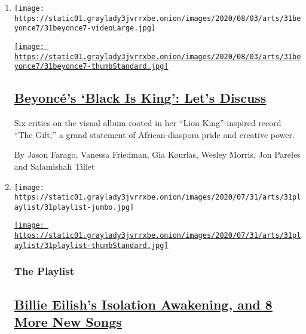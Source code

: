 \begin{enumerate}
\def\labelenumi{\arabic{enumi}.}
\item
  \texttt{[image: https://static01.graylady3jvrrxbe.onion/images/2020/08/03/arts/31beyonce7/31beyonce7-videoLarge.jpg]}

  \href{/2020/07/31/arts/music/beyonce-black-is-king.html}{\texttt{[image: https://static01.graylady3jvrrxbe.onion/images/2020/08/03/arts/31beyonce7/31beyonce7-thumbStandard.jpg]}}

  \hypertarget{beyoncuxe9s-black-is-king-lets-discuss}{%
  \subsection{\texorpdfstring{\href{/2020/07/31/arts/music/beyonce-black-is-king.html}{Beyoncé's
  `Black Is King': Let's
  Discuss}}{Beyoncé's `Black Is King': Let's Discuss}}\label{beyoncuxe9s-black-is-king-lets-discuss}}

  Six critics on the visual album rooted in her ``Lion King''-inspired
  record ``The Gift,'' a grand statement of African-diaspora pride and
  creative power.

  By Jason Farago, Vanessa Friedman, Gia Kourlas, Wesley Morris, Jon
  Pareles and Salamishah Tillet
\item
  \texttt{[image: https://static01.graylady3jvrrxbe.onion/images/2020/07/31/arts/31playlist/31playlist-jumbo.jpg]}

  \href{/2020/07/31/arts/music/playlist-billie-eilish-snakehips-a-boogie.html}{\texttt{[image: https://static01.graylady3jvrrxbe.onion/images/2020/07/31/arts/31playlist/31playlist-thumbStandard.jpg]}}

  \hypertarget{the-playlist}{%
  \subsubsection{The Playlist}\label{the-playlist}}

  \hypertarget{billie-eilishs-isolation-awakening-and-8-more-new-songs}{%
  \subsection{\texorpdfstring{\href{/2020/07/31/arts/music/playlist-billie-eilish-snakehips-a-boogie.html}{Billie
  Eilish's Isolation Awakening, and 8 More New
  Songs}}{Billie Eilish's Isolation Awakening, and 8 More New Songs}}\label{billie-eilishs-isolation-awakening-and-8-more-new-songs}}


\end{enumerate}
